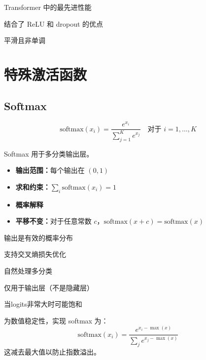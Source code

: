 \begin{advantages}
    \item Transformer 中的最先进性能
    \item 结合了 ReLU 和 dropout 的优点
    \item 平滑且非单调
\end{advantages}

\section{特殊激活函数}

\subsection{Softmax}

\begin{equation}
\text{softmax}(x_i) = \frac{e^{x_i}}{\sum_{j=1}^{K} e^{x_j}} \quad \text{对于 } i = 1, \ldots, K
\end{equation}

Softmax 用于多分类输出层。

\begin{properties}[Softmax的性质]
\begin{itemize}
    \item \textbf{输出范围：}每个输出在 $(0, 1)$
    \item \textbf{求和约束：}$\sum_i \text{softmax}(x_i) = 1$
    \item \textbf{概率解释}
    \item \textbf{平移不变：}对于任意常数 $c$，$\text{softmax}(x + c) = \text{softmax}(x)$
\end{itemize}
\end{properties}

\begin{advantages}
    \item 输出是有效的概率分布
    \item 支持交叉熵损失优化
    \item 自然处理多分类
\end{advantages}

\begin{disadvantages}
    \item 仅用于输出层（不是隐藏层）
    \item 当logits非常大时可能饱和
\end{disadvantages}

\begin{note}[实践中的Softmax]
为数值稳定性，实现 softmax 为：
\begin{equation}
\text{softmax}(x_i) = \frac{e^{x_i - \max(x)}}{\sum_j e^{x_j - \max(x)}}
\end{equation}
这减去最大值以防止指数溢出。
\end{note}

